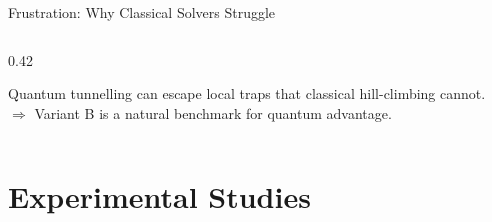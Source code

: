 \documentclass[aspectratio=169,10pt]{beamer}
\begin{document}
\begin{frame}{Frustration: Why Classical Solvers Struggle}
\begin{columns}[T]
\begin{column}{0.42\textwidth}
            \vspace{0.3cm}
            \begin{warningbox}
                \scriptsize Quantum tunnelling can escape local traps
                that classical hill-climbing cannot.\\[2pt]
                $\Rightarrow$ Variant B is a natural benchmark
                for quantum advantage.
            \end{warningbox}
        \end{column}
    \end{columns}
\end{frame}






\section{Experimental Studies}
\end{document}
